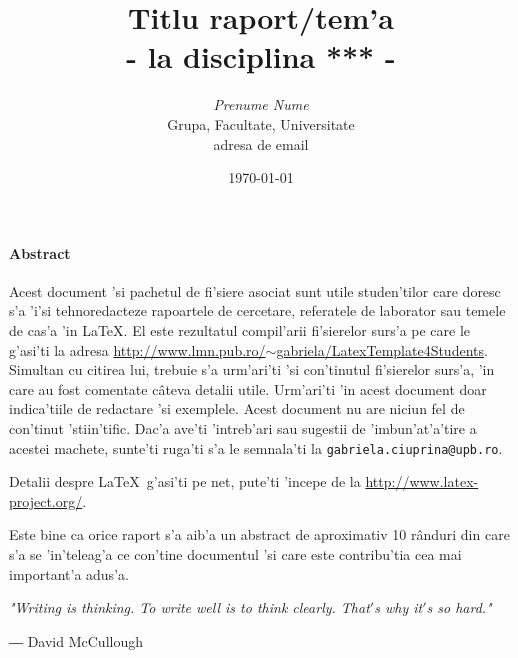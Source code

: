 \documentclass[12pt,twoside]{article}  %
\begin{document}
\title{Titlu raport/tem'a\\
{\small - la disciplina *** - }}
\author{{\em Prenume Nume} \\
 Grupa, Facultate, Universitate \\
adresa de email}
\date{\today}  %


\maketitle



\paragraph{Abstract}
Acest document 'si pachetul de fi'siere asociat sunt utile studen'tilor care doresc s'a 'i'si tehnoredacteze rapoartele de cercetare, referatele de laborator sau temele de cas'a 'in \LaTeX. El este rezultatul compil'arii fi'sierelor surs'a pe care le g'asi'ti la adresa
{\href{http://www.lmn.pub.ro/~gabriela/LatexTemplate4Students}{http://www.lmn.pub.ro/$\sim$gabriela/LatexTemplate4Students}}. Simultan cu citirea lui, trebuie s'a urm'ari'ti 'si con'tinutul fi'sierelor surs'a, 'in care au fost comentate c\^ateva detalii utile. Urm'ari'ti 'in acest document doar indica'tiile de redactare 'si exemplele. Acest document nu are niciun fel de con'tinut 'stiin'tific.
Dac'a ave'ti 'intreb'ari sau sugestii de 'imbun'at'a'tire a acestei machete, sunte'ti ruga'ti s'a le semnala'ti la
\texttt{gabriela.ciuprina@upb.ro}. 

Detalii despre \LaTeX\ g'asi'ti pe net, pute'ti 'incepe de la 
{\href{http://www.latex-project.org/}{http://www.latex-project.org/}}.

Este bine ca orice raport s'a aib'a un abstract de aproximativ 10 r\^anduri din care s'a se 'in'teleag'a ce con'tine documentul 'si care este contribu'tia cea mai important'a adus'a.



\vspace*{3cm}
{\color{blue}
\em
\hfill "Writing is thinking. To write well is to think clearly. That$'$s why it$'$s so hard."  %

\hfill ― David McCullough
}
\end{document}
